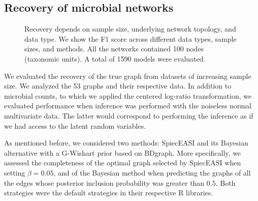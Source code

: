 \documentclass[
  a4paper,
]{article}
\begin{document}
\hypertarget{recovery-of-microbial-networks}{%
\subsection{Recovery of microbial
networks}\label{recovery-of-microbial-networks}}

\begin{figure}

\begin{minipage}[t]{\linewidth}

{\centering 


}

\end{minipage}%
\newline
\begin{minipage}[t]{\linewidth}

{\centering 


}

\end{minipage}%

\caption{\label{fig-prec_recall}Recovery depends on sample size,
underlying network topology, and data type. We show the F1 score across
different data types, sample sizes, and methods. All the networks
contained 100 nodes (taxonomic units). A total of 1590 models were
evaluated.}

\end{figure}

We evaluated the recovery of the true graph from datasets of increasing
sample size. We analyzed the 53 graphs and their respective data. In
addition to microbial counts, to which we applied the centered log-ratio
transformation, we evaluated performance when inference was performed
with the noiseless normal multivariate data. The latter would correspond
to performing the inference as if we had access to the latent random
variables.

As mentioned before, we considered two methods: SpiecEASI and its
Bayesian alternative with a G-Wishart prior based on BDgraph. More
specifically, we assessed the completeness of the optimal graph selected
by SpiecEASI when setting \(\beta=0.05\), and of the Bayesian method
when predicting the graphs of all the edges whose posterior inclusion
probability was greater than \(0.5\). Both strategies were the default
strategies in their respective R libraries.
\end{document}
